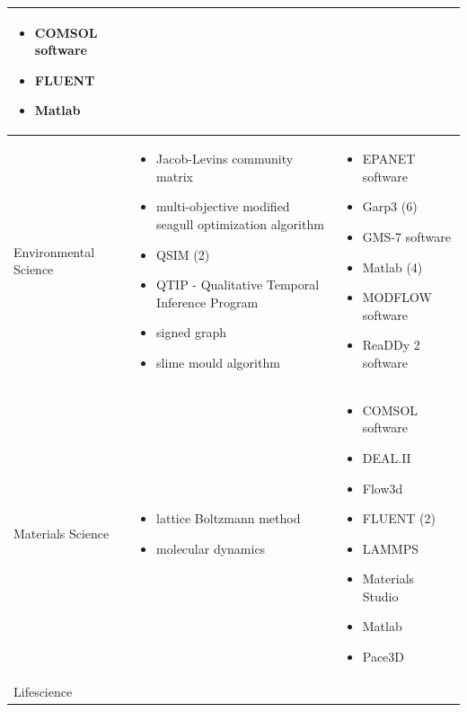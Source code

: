 \documentclass[utf8]{gradu3}
\begin{document}
\begin{longtable}[h]{|p{4cm}|p{5cm}|p{5cm}|}
    \begin{itemize}
        \item COMSOL software 
        \item FLUENT
        \item Matlab
    \end{itemize}
    \\
    \hline
    Environmental Science & \begin{itemize}
        \item Jacob-Levins community matrix
        \item multi-objective modified seagull optimization algorithm
        \item QSIM (2)
        \item QTIP - Qualitative Temporal Inference Program
        \item signed graph
        \item slime mould algorithm
    \end{itemize} &
    \begin{itemize}
        \item EPANET software
        \item Garp3 (6)
        \item GMS-7 software
        \item Matlab (4)
        \item MODFLOW software
        \item ReaDDy 2 software
    \end{itemize}
    \\
    \hline
    Materials Science & \begin{itemize}
        \item lattice Boltzmann method
        \item molecular dynamics
    \end{itemize} & 
    \begin{itemize}
        \item COMSOL software 
        \item DEAL.II
        \item Flow3d
        \item FLUENT (2)
        \item LAMMPS
        \item Materials Studio
        \item Matlab
        \item Pace3D 
    \end{itemize}
    \\
    \hline
    Lifescience & \begin{itemize}

\end{itemize}
\end{longtable}
\end{document}
